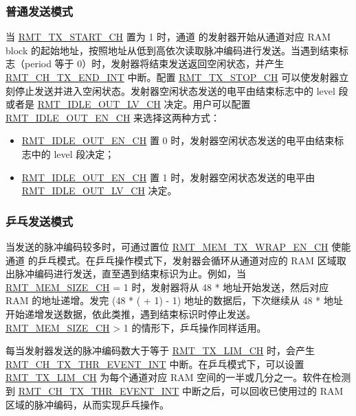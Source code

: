 \documentclass[main\_\_CN.tex]{subfiles}
\begin{document}
\subsubsection{普通发送模式}\label{sec:normal-tx-mode}
当 \hyperref[fielddesc:RMTTXSTARTCHN]{RMT\_TX\_START\_CH} 置为 1 时，通道  的发射器开始从通道对应 RAM block 的起始地址，按照地址从低到高依次读取脉冲编码进行发送。当遇到结束标志（period 等于 0）时，发射器将结束发送返回空闲状态，并产生 \hyperref[int:RMTCHnTXENDINT]{RMT\_CH\_TX\_END\_INT} 中断。配置 \hyperref[fielddesc:RMTTXSTOPCHN]{RMT\_TX\_STOP\_CH} 可以使发射器立刻停止发送并进入空闲状态。发射器空闲状态发送的电平由结束标志中的 level 段或者是 \hyperref[fielddesc:RMTIDLEOUTLVCHN]{RMT\_IDLE\_OUT\_LV\_CH} 决定。用户可以配置 \hyperref[fielddesc:RMTIDLEOUTENCHN]{RMT\_IDLE\_OUT\_EN\_CH} 来选择这两种方式：
\begin{itemize}
    \item \hyperref[fielddesc:RMTIDLEOUTENCHN]{RMT\_IDLE\_OUT\_EN\_CH} 置 0 时，发射器空闲状态发送的电平由结束标志中的 level 段决定；
    \item \hyperref[fielddesc:RMTIDLEOUTENCHN]{RMT\_IDLE\_OUT\_EN\_CH} 置 1 时，发射器空闲状态发送的电平由 \hyperref[fielddesc:RMTIDLEOUTLVCHN]{RMT\_IDLE\_OUT\_LV\_CH} 决定。
\end{itemize}


\subsubsection{乒乓发送模式}\label{sec:wrap-tx-mode}

当发送的脉冲编码较多时，可通过置位 \hyperref[fielddesc:RMTMEMTXWRAPENCHN]{RMT\_MEM\_TX\_WRAP\_EN\_CH} 使能通道  的乒乓模式。在乒乓操作模式下，发射器会循环从通道对应的 RAM 区域取出脉冲编码进行发送，直至遇到结束标识为止。例如，当 \hyperref[fielddesc:RMTMEMSIZECHN]{RMT\_MEM\_SIZE\_CH} = 1 时，发射器将从 48 *  地址开始发送，然后对应 RAM 的地址递增。发完 (48 * ( + 1) - 1) 地址的数据后，下次继续从 48 *  地址开始递增发送数据，依此类推，遇到结束标识时停止发送。\hyperref[fielddesc:RMTMEMSIZECHN]{RMT\_MEM\_SIZE\_CH} > 1 的情形下，乒乓操作同样适用。

每当发射器发送的脉冲编码数大于等于 \hyperref[fielddesc:RMTTXLIMCHN]{RMT\_TX\_LIM\_CH} 时，会产生 \hyperref[int:RMTCHnTXTHREVENTINT]{RMT\_CH\_TX\_THR\_EVENT\_INT} 中断。在乒乓模式下，可以设置 \hyperref[fielddesc:RMTTXLIMCHN]{RMT\_TX\_LIM\_CH} 为每个通道对应 RAM 空间的一半或几分之一。软件在检测到 \hyperref[int:RMTCHnTXTHREVENTINT]{RMT\_CH\_TX\_THR\_EVENT\_INT} 中断之后，可以回收已使用过的 RAM 区域的脉冲编码，从而实现乒乓操作。
\end{document}
